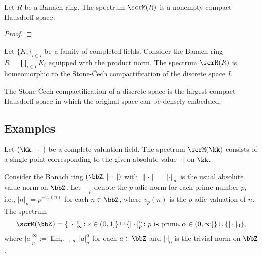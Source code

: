     \begin{theorem}\label{thm:spectrum_of_Banach_rings_is_nonempty_compact_Hausdorff}
        Let \(R\) be a Banach ring.
        The spectrum \(\scrM(R)\) is a nonempty compact Hausdorff space.
    \end{theorem}
    \begin{proof}
    \end{proof}

    \begin{lemma}\label{lem:spectrum_of_product_of_completed_fields}
        Let \(\{K_i\}_{i \in I}\) be a family of completed fields.
        Consider the Banach ring \(R = \prod_{i \in I} K_i\) equipped with the product norm.
        The spectrum \(\scrM(R)\) is homeomorphic to the Stone-\v{C}ech compactification of the discrete space \(I\).
    \end{lemma}

    \begin{remark}\label{rmk:some_fact_about_the_Stone_Cech_compactification}
        The Stone-\v{C}ech compactification of a discrete space is the largest compact Hausdorff space in which the original space can be densely embedded.
    \end{remark}


\subsection{Examples}

    \begin{example}\label{eg:spectrum_of_valuation_field}
        Let \((\kk, |\cdot|)\) be a complete valuation field.
        The spectrum \(\scrM(\kk)\) consists of a single point corresponding to the given absolute value \(|\cdot|\) on \(\kk\).
    \end{example}

    \begin{example}\label{eg:spectrum_of_Z_with_absolute_value_norm}
        Consider the Banach ring \((\bbZ, \|\cdot\|)\) with \(\|\cdot\| = |\cdot|_\infty\) is the usual absolute value norm on \(\bbZ\).
        Let \(|\cdot|_p\) denote the \(p\)-adic norm for each prime number \(p\), i.e., \(|n|_p = p^{-v_p(n)}\) for each \(n \in \bbZ\), where \(v_p(n)\) is the \(p\)-adic valuation of \(n\).
        The spectrum 
        \[ \scrM(\bbZ) = \{|\cdot|_{\infty}^\varepsilon \colon \varepsilon \in (0,1]\} \cup \{| \cdot |_p^\alpha \colon p \text{ is prime}, \alpha \in (0,\infty] \} \cup \{|\cdot|_0\}, \]
        where \(|a|_p^\infty := \lim_{\alpha \to \infty} |a|_p^\alpha\) for each \(a \in \bbZ\) and \(|\cdot|_0\) is the trivial norm on \(\bbZ\).
    \end{example}

